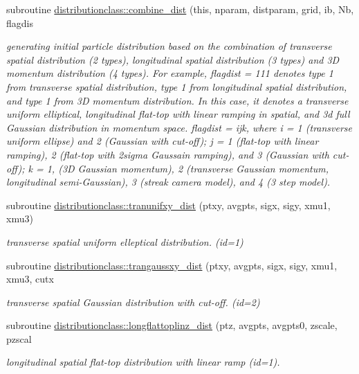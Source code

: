 \begin{DoxyCompactItemize}
subroutine \mbox{\hyperlink{namespacedistributionclass_ae01180ba4966edba5753229ef24e5b8b}{distributionclass\+::combine\+\_\+dist}} (this, nparam, distparam, grid, ib, Nb, flagdis
\begin{DoxyCompactList}\small\item\em generating initial particle distribution based on the combination of transverse spatial distribution (2 types), longitudinal spatial distribution (3 types) and 3D momentum distribution (4 types). For example, flagdist = 111 denotes type 1 from transverse spatial distribution, type 1 from longitudinal spatial distribution, and type 1 from 3D momentum distribution. In this case, it denotes a transverse uniform elliptical, longitudinal flat-\/top with linear ramping in spatial, and 3d full Gaussian distribution in momentum space. flagdist = ijk, where i = 1 (transverse uniform ellipse) and 2 (Gaussian with cut-\/off); j = 1 (flat-\/top with linear ramping), 2 (flat-\/top with 2sigma Gaussain ramping), and 3 (Gaussian with cut-\/off); k = 1, (3D Gaussian momentum), 2 (transverse Gaussian momentum, longitudinal semi-\/\+Gaussian), 3 (streak camera model), and 4 (3 step model). \end{DoxyCompactList}\item 
subroutine \mbox{\hyperlink{namespacedistributionclass_aec8b879df17219ee41f1855623176867}{distributionclass\+::tranunifxy\+\_\+dist}} (ptxy, avgpts, sigx, sigy, xmu1, xmu3)
\begin{DoxyCompactList}\small\item\em transverse spatial uniform elleptical distribution. (id=1) \end{DoxyCompactList}\item 
subroutine \mbox{\hyperlink{namespacedistributionclass_a42ccdb5100e3e35c9424c89dcac131c1}{distributionclass\+::trangaussxy\+\_\+dist}} (ptxy, avgpts, sigx, sigy, xmu1, xmu3, cutx
\begin{DoxyCompactList}\small\item\em transverse spatial Gaussian distribution with cut-\/off. (id=2) \end{DoxyCompactList}\item 
subroutine \mbox{\hyperlink{namespacedistributionclass_a00926191e33371dc32c2fdbaca1ee2a5}{distributionclass\+::longflattoplinz\+\_\+dist}} (ptz, avgpts, avgpts0, zscale, pzscal
\begin{DoxyCompactList}\small\item\em longitudinal spatial flat-\/top distribution with linear ramp (id=1). \end{DoxyCompactList}\item 

\end{DoxyCompactItemize}
